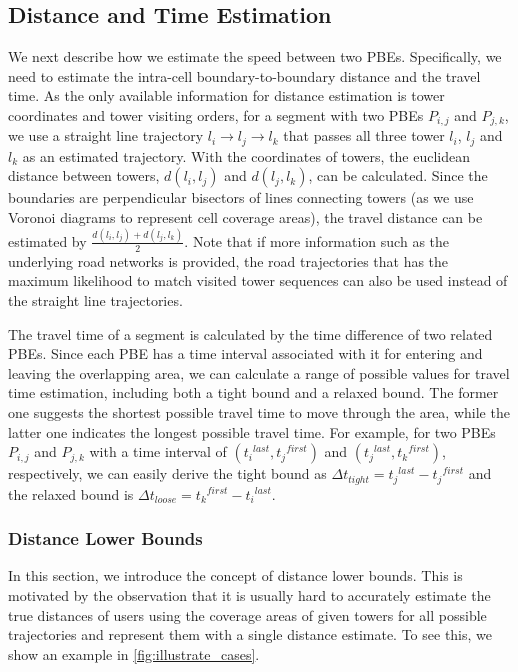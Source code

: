 \subsection{Distance and Time Estimation}

We next describe how we estimate the speed between two PBEs. Specifically, we need to estimate the intra-cell boundary-to-boundary distance and the travel time. As the only available information for distance estimation is tower coordinates and tower visiting orders, for a segment with two PBEs $P_{i,j}$ and $P_{j,k}$, we use a straight line trajectory $l_i \rightarrow l_j \rightarrow l_k$ that passes all three tower $l_i$, $l_j$ and $l_k$ as an estimated trajectory. With the coordinates of towers, the euclidean distance between towers, $d(l_i,l_j)$ and $d(l_j,l_k)$, can be calculated. Since the boundaries are perpendicular bisectors of lines connecting towers (as we use Voronoi diagrams to represent cell coverage areas), the travel distance can be estimated by $\frac{d(l_i,l_j) + d(l_j,l_k)}{2}$. Note that if more information such as the underlying road networks is provided, the road trajectories that has the maximum likelihood to match visited tower sequences can also be used instead of the straight line trajectories.

The travel time of a segment is calculated by the time difference of two related PBEs. Since each PBE has a time interval associated with it for entering and leaving the overlapping area, we can calculate a range of possible values for travel time estimation, including both a tight bound and a relaxed bound. The former one suggests the shortest possible travel time to move through the area, while the latter one indicates the longest possible travel time. For example, for two PBEs $P_{i,j}$ and $P_{j,k}$ with a time interval of $({t_i}^{last}, {t_j}^{first})$ and $({t_j}^{last}, {t_k}^{first})$, respectively, we can easily derive the tight bound as $\Delta t_{tight} = {t_j}^{last} - {t_j}^{first}$ and the relaxed bound is $\Delta t_{loose} = {t_k}^{first} - {t_i}^{last}$.

\subsubsection{Distance Lower Bounds}

In this section, we introduce the concept of distance lower bounds. This is motivated by the observation that it is usually hard to accurately estimate the true distances of users using the coverage areas of given towers for all possible trajectories and represent them with a single distance estimate. To see this, we show an example in \autoref{fig:illustrate_cases}.

